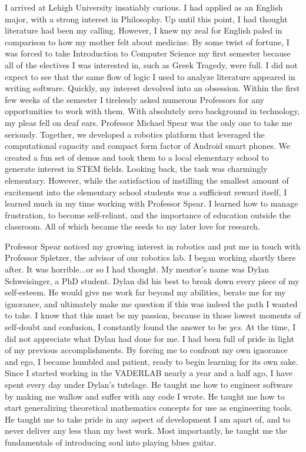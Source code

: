 \documentclass[10pt]{article}
\begin{document}
I arrived at Lehigh University insatiably curious. I had applied as an English
major, with a strong interest in Philosophy.  Up until this point, I had
thought literature had been my calling. However, I knew my zeal for English
paled in comparison to how my mother felt about medicine. By some twist of
fortune, I was forced to take Introduction to Computer Science my first
semester because all of the electives I was interested in, such as Greek
Tragedy, were full. I did not expect to see that the same flow of logic I used
to analyze literature appeared in writing software. Quickly, my interest
devolved into an obsession.  Within the first few weeks of the semester I
tirelessly asked numerous Professors for any opportunities to work with them.
With absolutely zero background in technology, my pleas fell on deaf ears.
Professor Michael Spear was the only one to take me seriously. Together, we
developed a robotics platform that leveraged the computational capacity and
compact form factor of Android smart phones. We created a fun set of demos and
took them to a local elementary school to generate interest in STEM fields.
Looking back, the task was charmingly elementary. However, while the
satisfaction of instilling the smallest amount of excitement into the
elementary school students was a sufficient reward itself, I learned much in my
time working with Professor Spear.  I learned how to manage frustration, to
become self-reliant, and the importance of education outside the classroom. All
of which became the seeds to my later love for research.

Professor Spear noticed my growing interest in robotics and put me in touch
with Professor Spletzer, the advisor of our robotics lab. I began working
shortly there after. It was horrible...or so I had thought. My mentor's name
was Dylan Schweisinger, a PhD student. Dylan did his best to break down every
piece of my self-esteem. He would give me work far beyond my abilities, berate
me for my ignorance, and ultimately make me question if this was indeed the
path I wanted to take. I know that this must be my passion, because in those
lowest moments of self-doubt and confusion, I constantly found the answer to be
\emph{yes}. At the time, I did not appreciate what Dylan had done for me. I had
been full of pride in light of my previous accomplishments. By forcing me to
confront my own ignorance and ego, I became humbled and patient, ready to begin
learning for its own sake. Since I started working in the VADERLAB nearly a
year and a half ago, I have spent every day under Dylan's tutelage.  He taught
me how to engineer software by making me wallow and suffer with any code I
wrote. He taught me how to start generalizing theoretical mathematics concepts
for use as engineering tools. He taught me to take pride in any aspect of
development I am apart of, and to never deliver any less than my best work.
Most importantly, he taught me the fundamentals of introducing soul into
playing blues guitar. 
\end{document}
